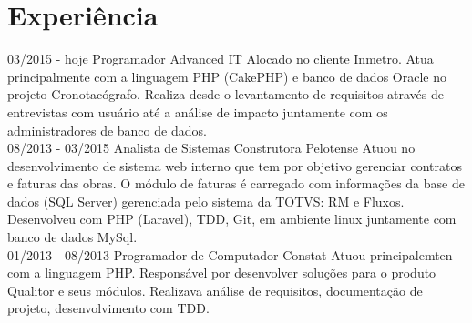 \documentclass[]{friggeri-cv}
\begin{document}
\section{Experiência}
\begin{entrylist}
  \entry
    {03/2015 - hoje}
    {Programador}
    {Advanced IT}
    {Alocado no cliente Inmetro. Atua principalmente com a linguagem PHP (CakePHP) e banco de dados Oracle no projeto Cronotacógrafo. Realiza desde o levantamento de requisitos através de entrevistas com usuário até a análise de impacto juntamente com os administradores de banco de dados.\\}
  \entry
    {08/2013 - 03/2015}
    {Analista de Sistemas}
    {Construtora Pelotense}
    {Atuou no desenvolvimento de sistema web interno que tem por objetivo gerenciar contratos e faturas das obras. O módulo de faturas é carregado com informações da base de dados (SQL Server) gerenciada pelo sistema da TOTVS: RM e Fluxos. Desenvolveu com PHP (Laravel), TDD, Git, em ambiente linux juntamente com banco de dados MySql.\\}
    \entry
    {01/2013 - 08/2013}
    {Programador de Computador}
    {Constat}
    {Atuou principalemten com a linguagem PHP. Responsável por desenvolver soluções para o produto Qualitor e seus módulos. Realizava análise de requisitos, documentação de projeto, desenvolvimento com TDD.}
\end{entrylist}
\end{document}

